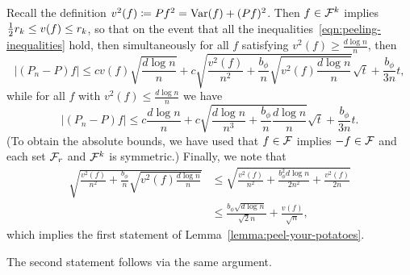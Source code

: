 \documentclass[11pt]{article}
\newcommand{\radphi}{b_{\phi}}
\begin{document}
Recall the definition $v^2(f) \coloneqq Pf^2 = {\rm Var}(f) + (Pf)^2$. Then
$f \in \mathcal{F}^k$ implies $\frac{1}{2} r_k \le v(f) \le r_k$, so that
on the event that all the inequalities~\eqref{eqn:peeling-inequalities}
hold, then simultaneously for all $f$ satisfying
$v^2(f) \ge \frac{d \log n}{n}$, then
\begin{equation*}
  \left|(P_n - P) f\right|
  \le c v(f) \sqrt{\frac{d \log n}{n}}
  + c \sqrt{\frac{v^2(f)}{n^2}
    + \frac{\radphi}{n} \sqrt{v^2(f) \frac{d \log n}{n}}}
  \sqrt{t} + \frac{\radphi}{3n} t,
\end{equation*}
while for all $f$ with $v^2(f) \le \frac{d \log n}{n}$ we have
\begin{equation*}
  |(P_n - P) f|
  \le c \frac{d \log n}{n}
  + c \sqrt{\frac{d \log n}{n^3}
    + \frac{\radphi}{n} \frac{d \log n}{n}} \sqrt{t} + \frac{\radphi}{3n} t.
\end{equation*}
(To obtain the absolute bounds, we have used that $f \in \mathcal{F}$ implies
$-f \in \mathcal{F}$ and each set $\mathcal{F}_r$ and $\mathcal{F}^k$ is symmetric.)
Finally, we note that
\begin{align*}
  \sqrt{\frac{v^2(f)}{n^2}
    + \frac{\radphi}{n}
    \sqrt{v^2(f) \frac{d \log n}{n}}}
  & \le \sqrt{\frac{v^2(f)}{n^2}
    + \frac{\radphi^2 d \log n}{2 n^2}
    + \frac{v^2(f)}{2 n}} \\
  & \le \frac{\radphi \sqrt{d \log n}}{\sqrt{2} n}
  + \frac{v(f)}{\sqrt{n}},
\end{align*}
which implies the first statement of Lemma~\ref{lemma:peel-your-potatoes}.

The second statement follows via the same argument.



\end{document}
